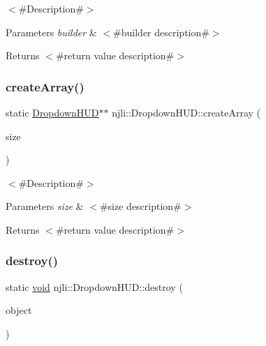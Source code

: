$<$\#\+Description\#$>$


\begin{DoxyParams}{Parameters}
{\em builder} & $<$\#builder description\#$>$\\
\hline
\end{DoxyParams}
\begin{DoxyReturn}{Returns}
$<$\#return value description\#$>$ 
\end{DoxyReturn}
\mbox{\label{classnjli_1_1_dropdown_h_u_d_a095aa2d4f9246574b3c23f88a13dfb1c}} 
\subsubsection{\texorpdfstring{create\+Array()}{createArray()}}
{\footnotesize\ttfamily static \mbox{\hyperlink{classnjli_1_1_dropdown_h_u_d}{Dropdown\+H\+UD}}$\ast$$\ast$ njli\+::\+Dropdown\+H\+U\+D\+::create\+Array (\begin{DoxyParamCaption}\item[{const \mbox{\hyperlink{_util_8h_a10e94b422ef0c20dcdec20d31a1f5049}{u32}}}]{size }\end{DoxyParamCaption})\hspace{0.3cm}{\ttfamily [static]}}

$<$\#\+Description\#$>$


\begin{DoxyParams}{Parameters}
{\em size} & $<$\#size description\#$>$\\
\hline
\end{DoxyParams}
\begin{DoxyReturn}{Returns}
$<$\#return value description\#$>$ 
\end{DoxyReturn}
\mbox{\label{classnjli_1_1_dropdown_h_u_d_a0e7fb8e32c9502d53097d087c6ca8d72}} 
\subsubsection{\texorpdfstring{destroy()}{destroy()}}
{\footnotesize\ttfamily static \mbox{\hyperlink{_thread_8h_af1e856da2e658414cb2456cb6f7ebc66}{void}} njli\+::\+Dropdown\+H\+U\+D\+::destroy (\begin{DoxyParamCaption}\item[{\mbox{\hyperlink{classnjli_1_1_dropdown_h_u_d}{Dropdown\+H\+UD}} $\ast$}]{object }\end{DoxyParamCaption})\hspace{0.3cm}{\ttfamily [static]}}

